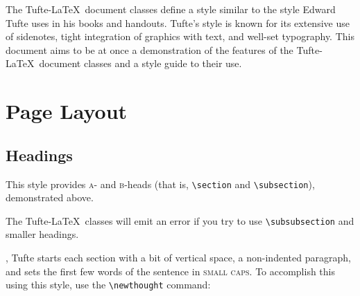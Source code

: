\begin{abstract}
\noindent
This document describes the Tufte handout \LaTeX\ document style.
It also provides examples and comments on the style's use.
Only a brief overview is presented here;
for a complete reference, see the sample book.
\end{abstract}


The Tufte-\LaTeX\ document classes define a style similar to the
style Edward Tufte uses in his books and handouts.  Tufte's style is known
for its extensive use of sidenotes, tight integration of graphics with
text, and well-set typography.  This document aims to be at once a
demonstration of the features of the Tufte-\LaTeX\ document classes
and a style guide to their use.

\section{Page Layout}\label{sec:page-layout}
\subsection{Headings}\label{sec:headings}
This style provides \textsc{a}- and \textsc{b}-heads (that is,
\Verb|\section| and \Verb|\subsection|), demonstrated above.

The Tufte-\LaTeX\ classes will emit an error if you try to use
\linebreak\Verb|\subsubsection| and smaller headings.

,\cite{Tufte2006} Tufte
starts each section with a bit of vertical space, a non-indented paragraph,
and sets the first few words of the sentence in \textsc{small caps}.  To
accomplish this using this style, use the \Verb|\newthought| command:  
\begin{docspec}
\end{docspec}

